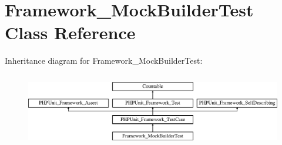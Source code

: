 \hypertarget{class_framework___mock_builder_test}{}\section{Framework\+\_\+\+Mock\+Builder\+Test Class Reference}
\label{class_framework___mock_builder_test}
Inheritance diagram for Framework\+\_\+\+Mock\+Builder\+Test\+:\begin{figure}[H]
\begin{center}
\leavevmode
\includegraphics[height=3.303835cm]{class_framework___mock_builder_test}
\end{center}
\end{figure}
